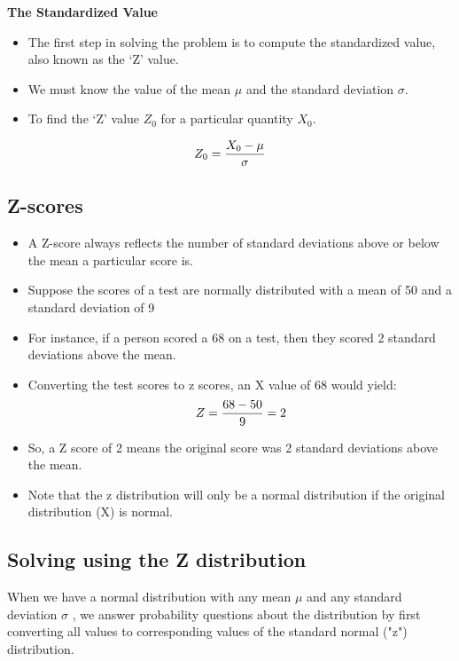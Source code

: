 \documentclass[]{report}
\begin{document}
{\textbf{The Standardized Value}

\begin{itemize}
\item The first step in solving the problem is to compute the standardized value, also known as the `Z' value.

\item We must know the value of the mean $\mu$ and the standard deviation $\sigma$.

\item To find the `Z' value $Z_0$ for a particular quantity $X_0$.
\end{itemize}



\vspace{0.1cm}
\[
Z_{0} = {X_0 - \mu \over \sigma}
\]

\subsection{Z-scores}
\begin{itemize}
\item A Z-score always reflects the number of standard deviations above or below the mean a particular score is.
\item 
Suppose the scores of a test are normally distributed with a mean of 50 and a standard deviation of 9
\item For instance, if a person scored a 68 on a test, then they scored 2 standard deviations above the mean.

\item Converting the test scores to z scores, an X value of 68 would yield:
\[ Z = {68 - 50 \over 9} =2 \]

\item So, a Z score of 2 means the original score was 2 standard deviations above the mean.


\item Note that the z distribution will only be a normal distribution if the original distribution (X) is normal. 
\end{itemize}
}







\subsection{Solving using the Z distribution}
When we have a normal distribution with any mean $\mu$  and any standard deviation $\sigma$ , we answer probability questions about the distribution by first converting all values to corresponding values of the standard normal ("z") distribution.
\end{document}
